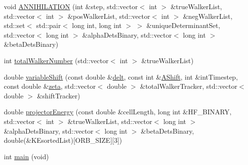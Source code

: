 \begin{DoxyCompactItemize}
\item 
void \hyperlink{UEG__MAIN__binarytest_8C_a87f327cb0a53f992caea1d8bee3816d8}{A\-N\-N\-I\-H\-I\-L\-A\-T\-I\-O\-N} (int \&step, std\-::vector$<$ int $>$ \&true\-Walker\-List, std\-::vector$<$ int $>$ \&pos\-Walker\-List, std\-::vector$<$ int $>$ \&neg\-Walker\-List, std\-::set$<$ std\-::pair$<$ long int, long int $>$ $>$ \&unique\-Determinant\-Set, std\-::vector$<$ long int $>$ \&alpha\-Dets\-Binary, std\-::vector$<$ long int $>$ \&beta\-Dets\-Binary)
\item 
int \hyperlink{UEG__MAIN__binarytest_8C_a9e40179604d09f7f8b1266958b11d930}{total\-Walker\-Number} (std\-::vector$<$ int $>$ \&true\-Walker\-List)
\item 
double \hyperlink{UEG__MAIN__binarytest_8C_a0ec81bf6b6e5089a5647fb2c8205e1a6}{variable\-Shift} (const double \&\hyperlink{UEG__MAIN__binarytest_8C_aa06f5594efa32a5569766c36690b4a22}{delt}, const int \&\hyperlink{UEG__MAIN__binarytest_8C_a1b1b50ff28122bf25bbd141938893243}{A\-Shift}, int \&int\-Timestep, const double \&\hyperlink{UEG__MAIN__binarytest_8C_a50fb6782013c8c12243ca553cee0971a}{zeta}, std\-::vector$<$ double $>$ \&total\-Walker\-Tracker, std\-::vector$<$ double $>$ \&shift\-Tracker)
\item 
double \hyperlink{UEG__MAIN__binarytest_8C_a7a688d4b7bc7a4cc8a4a6b3a000a21ba}{projector\-Energy} (const double \&cell\-Length, long int \&H\-F\-\_\-\-B\-I\-N\-A\-R\-Y, std\-::vector$<$ int $>$ \&true\-Walker\-List, std\-::vector$<$ long int $>$ \&alpha\-Dets\-Binary, std\-::vector$<$ long int $>$ \&beta\-Dets\-Binary, double(\&K\-Esorted\-List)\mbox{[}O\-R\-B\-\_\-\-S\-I\-Z\-E\mbox{]}\mbox{[}3\mbox{]})
\item 
int \hyperlink{UEG__MAIN__binarytest_8C_a840291bc02cba5474a4cb46a9b9566fe}{main} (void)
\end{DoxyCompactItemize}
